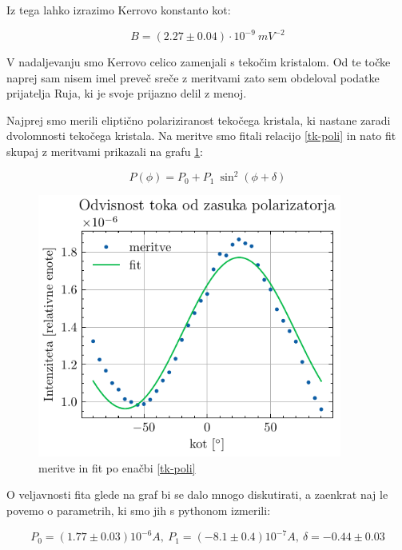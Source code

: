 \documentclass[12pt]{article}
\begin{document}
\newpage
\noindent Iz tega lahko izrazimo Kerrovo konstanto kot:

\begin{equation*}
    B = (2.27\pm 0.04) \cdot 10^{-9}\ m V^{-2}
\end{equation*}

\noindent V nadaljevanju smo Kerrovo celico zamenjali s tekočim kristalom. Od te točke naprej sam nisem imel preveč sreče z meritvami zato sem obdeloval podatke prijatelja Ruja, ki je svoje prijazno delil z menoj.

Najprej smo merili eliptično polariziranost tekočega kristala, ki nastane zaradi dvolomnosti tekočega kristala. Na meritve smo fitali relacijo \ref{tk-poli} in nato fit skupaj z meritvami prikazali na grafu \ref{tkpoli}:

\begin{equation}
    P(\phi) = P_0 + P_1\ \sin^2 \left(\phi + \delta\right)
    \label{tk-poli}
\end{equation}

\begin{figure}[ht]
\begin{center}
    \includegraphics[width=10cm]{tkpoli.pdf}
    \caption{meritve in fit po enačbi \ref{tk-poli}}
    \label{tkpoli}
\end{center}
\end{figure}
O veljavnosti fita glede na graf bi se dalo mnogo diskutirati, a zaenkrat naj le povemo o parametrih, ki smo jih s pythonom izmerili:

\begin{equation*}
    P_0 = (1.77\pm 0.03)10^{-6}A,\ P_1 = (-8.1\pm 0.4)10^{-7}A,\ \delta = -0.44\pm 0.03
\end{equation*}
\end{document}
